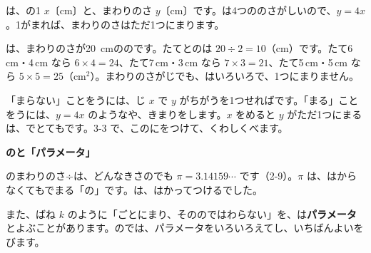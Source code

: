 は、の1 $x$〔cm〕と、まわりのさ $y$〔cm〕です。は4つののさがしいので、$y=4x$。1がまれば、まわりのさはただ1つにまります。

は、まわりのさが\qty{20}{cm}ののです。たてとのは $20\div2=10$（cm）です。たて6\,cm・4\,cm なら $6\times4=24$、たて7\,cm・3\,cm なら $7\times3=21$、たて5\,cm・5\,cm なら $5\times5=25$（cm$^2$）。まわりのさがじでも、はいろいろで、1つにまりません。

「まらない」ことをうには、じ $x$ で $y$ がちがうを1つせればです。「まる」ことをうには、$y=4x$ のようなや、きまりをします。$x$ をめると $y$ がただ1つにまるは、でとてもです。3-3 で、このにをつけて、くわしくべます。

\begin{motto}[1]
\textbf{のと「パラメータ」}\par
{}のまわりのさ÷は、どんなきさのでも $\pi=3.14159\cdots$ です（2-9）。$\pi$ は、はからなくてもでまる「の」です。は、はかってつけるでした。\par
また、ばね $k$ のように「ごとにまり、そののではわらない」を、は\textbf{パラメータ}とよぶことがあります。のでは、パラメータをいろいろえてし、いちばんよいをびます。
\end{motto}

\begin{kotoba}
\small
{}
\end{kotoba}

